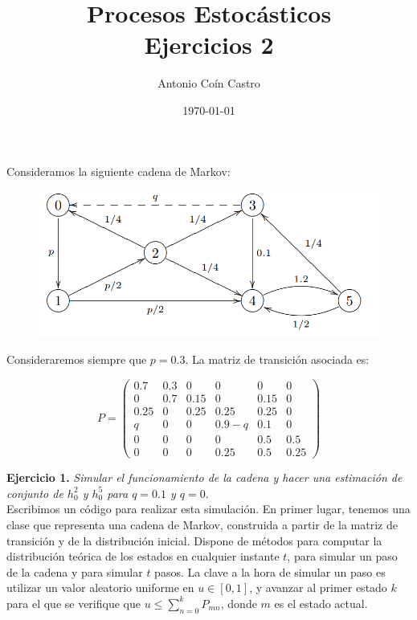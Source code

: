 \documentclass[11pt,a4paper]{article}
\title{Procesos Estocásticos\\ \Large{Ejercicios 2} }
\author{Antonio Coín Castro}
\date{\today}
\begin{document}
\maketitle

Consideramos la siguiente cadena de Markov:

\begin{figure}[h!]
  \centering
  \includegraphics[width=.6\textwidth]{markov.png}
\end{figure}

Consideraremos siempre que $p=0.3$. La matriz de transición asociada es:

\[
P=\begin{pmatrix}
0.7 & 0.3 & 0 & 0 & 0 & 0\\
0 & 0.7 & 0.15 & 0 & 0.15 & 0\\
0.25 & 0 & 0.25 & 0.25 & 0.25 & 0\\
q & 0 & 0 & 0.9-q & 0.1 & 0\\
0 & 0 & 0 & 0 & 0.5 & 0.5\\
0 & 0 & 0 & 0.25 & 0.5 & 0.25
\end{pmatrix}
\]

\textbf{Ejercicio 1.} \textit{Simular el funcionamiento de la cadena y hacer una estimación de conjunto de $h_0^2$ y $h_0^5$ para $q=0.1$ y $q=0$}.\\

Escribimos un código para realizar esta simulación. En primer lugar, tenemos una clase que representa una cadena de Markov, construida a partir de la matriz de transición y de la distribución inicial. Dispone de métodos para computar la distribución teórica de los estados en cualquier instante $t$, para simular un paso de la cadena y para simular $t$ pasos. La clave a la hora de simular un paso es utilizar un valor aleatorio uniforme en $u \in [0,1]$, y avanzar al primer estado $k$ para el que se verifique que $u \leq \sum_{n=0}^k P_{mn}$, donde $m$ es el estado actual.
\end{document}
